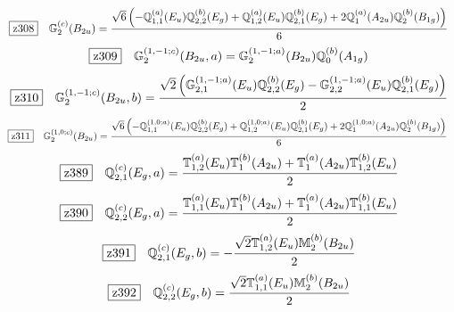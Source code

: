 \documentclass[fleqn,10pt,landscape]{jsarticle}
\begin{document}
\begin{dmath*}
\hspace*{3mm}\fbox{z308}\quad \mathbb{G}_{2}^{(c)}(B_{2u})=\frac{\sqrt{6} \left(- \mathbb{Q}_{1,1}^{(a)}(E_{u}) \mathbb{Q}_{2,2}^{(b)}(E_{g}) + \mathbb{Q}_{1,2}^{(a)}(E_{u}) \mathbb{Q}_{2,1}^{(b)}(E_{g}) + 2 \mathbb{Q}_{1}^{(a)}(A_{2u}) \mathbb{Q}_{2}^{(b)}(B_{1g})\right)}{6}
\end{dmath*}
\begin{dmath*}
\hspace*{3mm}\fbox{z309}\quad \mathbb{G}_{2}^{(1,-1;c)}(B_{2u},a)=\mathbb{G}_{2}^{(1,-1;a)}(B_{2u}) \mathbb{Q}_{0}^{(b)}(A_{1g})
\end{dmath*}
\begin{dmath*}
\hspace*{3mm}\fbox{z310}\quad \mathbb{G}_{2}^{(1,-1;c)}(B_{2u},b)=\frac{\sqrt{2} \left(\mathbb{G}_{2,1}^{(1,-1;a)}(E_{u}) \mathbb{Q}_{2,2}^{(b)}(E_{g}) - \mathbb{G}_{2,2}^{(1,-1;a)}(E_{u}) \mathbb{Q}_{2,1}^{(b)}(E_{g})\right)}{2}
\end{dmath*}
\begin{dmath*}
\hspace*{3mm}\fbox{z311}\quad \mathbb{G}_{2}^{(1,0;c)}(B_{2u})=\frac{\sqrt{6} \left(- \mathbb{Q}_{1,1}^{(1,0;a)}(E_{u}) \mathbb{Q}_{2,2}^{(b)}(E_{g}) + \mathbb{Q}_{1,2}^{(1,0;a)}(E_{u}) \mathbb{Q}_{2,1}^{(b)}(E_{g}) + 2 \mathbb{Q}_{1}^{(1,0;a)}(A_{2u}) \mathbb{Q}_{2}^{(b)}(B_{1g})\right)}{6}
\end{dmath*}
\begin{dmath*}
\hspace*{3mm}\fbox{z389}\quad \mathbb{Q}_{2,1}^{(c)}(E_{g},a)=\frac{\mathbb{T}_{1,2}^{(a)}(E_{u}) \mathbb{T}_{1}^{(b)}(A_{2u}) + \mathbb{T}_{1}^{(a)}(A_{2u}) \mathbb{T}_{1,2}^{(b)}(E_{u})}{2}
\end{dmath*}
\begin{dmath*}
\hspace*{3mm}\fbox{z390}\quad \mathbb{Q}_{2,2}^{(c)}(E_{g},a)=\frac{\mathbb{T}_{1,1}^{(a)}(E_{u}) \mathbb{T}_{1}^{(b)}(A_{2u}) + \mathbb{T}_{1}^{(a)}(A_{2u}) \mathbb{T}_{1,1}^{(b)}(E_{u})}{2}
\end{dmath*}
\begin{dmath*}
\hspace*{3mm}\fbox{z391}\quad \mathbb{Q}_{2,1}^{(c)}(E_{g},b)=- \frac{\sqrt{2} \mathbb{T}_{1,2}^{(a)}(E_{u}) \mathbb{M}_{2}^{(b)}(B_{2u})}{2}
\end{dmath*}
\begin{dmath*}
\hspace*{3mm}\fbox{z392}\quad \mathbb{Q}_{2,2}^{(c)}(E_{g},b)=\frac{\sqrt{2} \mathbb{T}_{1,1}^{(a)}(E_{u}) \mathbb{M}_{2}^{(b)}(B_{2u})}{2}
\end{dmath*}
\end{document}
